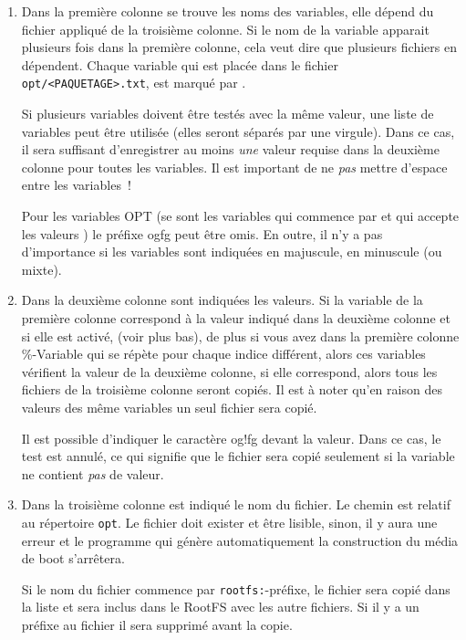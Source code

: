     \begin{enumerate}
      \item Dans la première colonne se trouve les noms des variables,
        elle dépend du fichier appliqué de la troisième colonne. Si le nom
        de la variable apparait plusieurs fois dans la première colonne,
        cela veut dire que plusieurs fichiers en dépendent. Chaque variable
        qui est placée dans le fichier \texttt{opt/<PAQUETAGE>.txt}, est marqué
        par .

        Si plusieurs variables doivent être testés avec la même valeur, une liste
		de variables peut être utilisée (elles seront séparés par une virgule). Dans ce
		cas, il sera suffisant d'enregistrer au moins \emph{une} valeur requise dans la
		deuxième colonne pour toutes les variables. Il est important de ne \emph{pas} mettre
		d'espace entre les variables~!

        Pour les variables OPT (se sont les variables qui commence par  et qui
		accepte les valeurs ) le préfixe og{}fg{} peut être omis.
		En outre, il n'y a pas d'importance si les variables sont indiquées en majuscule,
		en minuscule (ou mixte).

      \item Dans la deuxième colonne sont indiquées les valeurs. Si la variable
        de la première colonne correspond à la valeur indiqué dans la deuxième
        colonne et si elle est activé, (voir plus bas), de plus si vous avez
		dans la première colonne \%-Variable qui se répète pour chaque indice différent,
		alors ces variables vérifient la valeur de la deuxième colonne, si elle
		correspond, alors tous les fichiers de la troisième colonne seront copiés.
		Il est à noter qu’en raison des valeurs des même variables un seul fichier
        sera copié.

        Il est possible d'indiquer le caractère og{}!fg{} devant la valeur. Dans ce cas,
		le test est annulé, ce qui signifie que le fichier sera copié seulement si la variable
		ne contient \emph{pas} de valeur.

      \item Dans la troisième colonne est indiqué le nom du fichier. Le chemin
        est relatif au répertoire \texttt{opt}. Le fichier doit exister et être lisible,
        sinon, il y aura une erreur et le programme  qui génère
        automatiquement la construction du média de boot s’arrêtera.

        Si le nom du fichier commence par
        \texttt{rootfs:}-préfixe, le fichier sera copié dans la
        liste et sera inclus dans le RootFS avec les autre fichiers. Si il y a
        un préfixe au fichier il sera supprimé avant la copie.


\end{enumerate}
